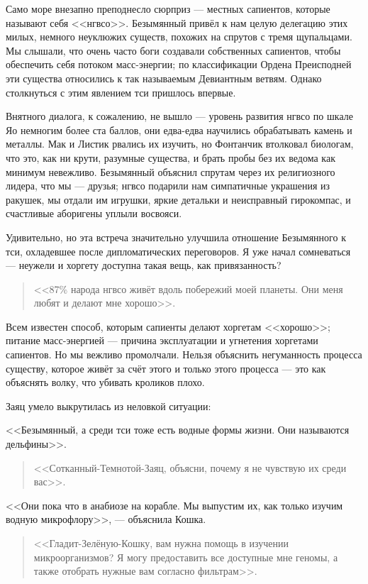 Само море внезапно преподнесло сюрприз --- местных сапиентов, которые называют себя <<нгвсо>>.
Безымянный привёл к нам целую делегацию этих милых, немного неуклюжих существ, похожих на спрутов с тремя щупальцами.
Мы слышали, что очень часто боги создавали собственных сапиентов, чтобы обеспечить себя потоком масс-энергии;
по классификации Ордена Преисподней эти существа относились к так называемым Девиантным ветвям.
Однако столкнуться с этим явлением тси пришлось впервые.

Внятного диалога, к сожалению, не вышло --- уровень развития нгвсо по шкале Яо немногим более ста баллов, они едва-едва научились обрабатывать камень и металлы.
Мак и Листик рвались их изучить, но Фонтанчик втолковал биологам, что это, как ни крути, разумные существа, и брать пробы без их ведома как минимум невежливо.
Безымянный объяснил спрутам через их религиозного лидера, что мы --- друзья;
нгвсо подарили нам симпатичные украшения из ракушек, мы отдали им игрушки, яркие детальки и неисправный гирокомпас, и счастливые аборигены уплыли восвояси.

Удивительно, но эта встреча значительно улучшила отношение Безымянного к тси, охладевшее после дипломатических переговоров.
Я уже начал сомневаться --- неужели и хоргету доступна такая вещь, как привязанность?

\begin{quote}
<<87\% народа нгвсо живёт вдоль побережий моей планеты.
Они меня любят и делают мне хорошо>>.
\end{quote}

Всем известен способ, которым сапиенты делают хоргетам <<хорошо>>;
питание масс-энергией --- причина эксплуатации и угнетения хоргетами сапиентов.
Но мы вежливо промолчали.
Нельзя объяснить негуманность процесса существу, которое живёт за счёт этого и только этого процесса --- это как объяснять волку, что убивать кроликов плохо.

Заяц умело выкрутилась из неловкой ситуации:

<<Безымянный, а среди тси тоже есть водные формы жизни.
Они называются дельфины>>.

\begin{quote}
<<Сотканный-Темнотой-Заяц, объясни, почему я не чувствую их среди вас>>.
\end{quote}

<<Они пока что в анабиозе на корабле.
Мы выпустим их, как только изучим водную микрофлору>>, --- объяснила Кошка.

\begin{quote}
<<Гладит-Зелёную-Кошку, вам нужна помощь в изучении микроорганизмов?
Я могу предоставить все доступные мне геномы, а также отобрать нужные вам согласно фильтрам>>.
\end{quote}

